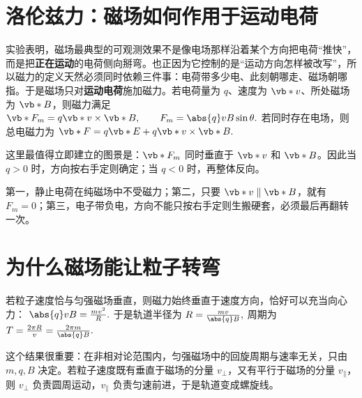 \documentclass[lang=cn,11pt]{elegantbook}
\begin{document}
\section{洛伦兹力：磁场如何作用于运动电荷}

实验表明，磁场最典型的可观测效果不是像电场那样沿着某个方向把电荷“推快”，而是把\textbf{正在运动}的电荷侧向掰弯。也正因为它控制的是“运动方向怎样被改写”，所以磁力的定义天然必须同时依赖三件事：电荷带多少电、此刻朝哪走、磁场朝哪指。于是磁场只对\textbf{运动电荷}施加磁力。若电荷量为 \(q\)、速度为 \(\vb*{v}\)、所处磁场为 \(\vb*{B}\)，则磁力满足
 \(\vb*{F}_m=q\vb*{v}\times \vb*{B}, \qquad F_m=\abs{q}vB\sin\theta.\) 
若同时存在电场，则总电磁力为
 \(\vb*{F}=q\vb*{E}+q\vb*{v}\times \vb*{B}.\) 

这里最值得立即建立的图景是：\(\vb*{F}_m\) 同时垂直于 \(\vb*{v}\) 和 \(\vb*{B}\)。因此当 \(q>0\) 时，方向按右手定则确定；当 \(q<0\) 时，再整体反向。

\begin{note}
 第一，静止电荷在纯磁场中不受磁力；第二，只要 \(\vb*{v}\parallel\vb*{B}\)，就有 \(F_m=0\)；第三，电子带负电，方向不能只按右手定则生搬硬套，必须最后再翻转一次。
\end{note}

\section{为什么磁场能让粒子转弯}

若粒子速度恰与匀强磁场垂直，则磁力始终垂直于速度方向，恰好可以充当向心力：
 \(\abs{q}vB=\frac{mv^2}{R}.\) 
于是轨道半径为
 \(R=\frac{mv}{\abs{q}B},\) 
周期为
 \(T=\frac{2\pi R}{v}=\frac{2\pi m}{\abs{q}B}.\) 

这个结果很重要：在非相对论范围内，匀强磁场中的回旋周期与速率无关，只由 \(m,q,B\) 决定。若粒子速度既有垂直于磁场的分量 \(v_\perp\)，又有平行于磁场的分量 \(v_\parallel\)，则 \(v_\perp\) 负责圆周运动，\(v_\parallel\) 负责匀速前进，于是轨道变成螺旋线。

\begin{center}
\end{center}
\end{document}
